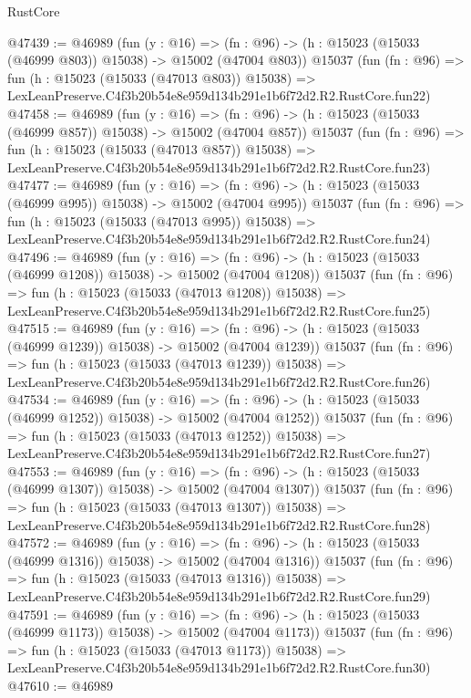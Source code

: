 \begin{lexlean}{RustCore}
\begin{coremodule}
@47439 := @46989
    (fun (y : @16) =>
    (fn : @96) -> (h : @15023 (@15033 (@46999 @803)) @15038) -> @15002 (@47004 @803))
    @15037
    (fun (fn : @96) =>
    fun (h : @15023 (@15033 (@47013 @803)) @15038) =>
    LexLeanPreserve.C4f3b20b54e8e959d134b291e1b6f72d2.R2.RustCore.fun22)
@47458 := @46989
    (fun (y : @16) =>
    (fn : @96) -> (h : @15023 (@15033 (@46999 @857)) @15038) -> @15002 (@47004 @857))
    @15037
    (fun (fn : @96) =>
    fun (h : @15023 (@15033 (@47013 @857)) @15038) =>
    LexLeanPreserve.C4f3b20b54e8e959d134b291e1b6f72d2.R2.RustCore.fun23)
@47477 := @46989
    (fun (y : @16) =>
    (fn : @96) -> (h : @15023 (@15033 (@46999 @995)) @15038) -> @15002 (@47004 @995))
    @15037
    (fun (fn : @96) =>
    fun (h : @15023 (@15033 (@47013 @995)) @15038) =>
    LexLeanPreserve.C4f3b20b54e8e959d134b291e1b6f72d2.R2.RustCore.fun24)
@47496 := @46989
    (fun (y : @16) =>
    (fn : @96) -> (h : @15023 (@15033 (@46999 @1208)) @15038) -> @15002 (@47004 @1208))
    @15037
    (fun (fn : @96) =>
    fun (h : @15023 (@15033 (@47013 @1208)) @15038) =>
    LexLeanPreserve.C4f3b20b54e8e959d134b291e1b6f72d2.R2.RustCore.fun25)
@47515 := @46989
    (fun (y : @16) =>
    (fn : @96) -> (h : @15023 (@15033 (@46999 @1239)) @15038) -> @15002 (@47004 @1239))
    @15037
    (fun (fn : @96) =>
    fun (h : @15023 (@15033 (@47013 @1239)) @15038) =>
    LexLeanPreserve.C4f3b20b54e8e959d134b291e1b6f72d2.R2.RustCore.fun26)
@47534 := @46989
    (fun (y : @16) =>
    (fn : @96) -> (h : @15023 (@15033 (@46999 @1252)) @15038) -> @15002 (@47004 @1252))
    @15037
    (fun (fn : @96) =>
    fun (h : @15023 (@15033 (@47013 @1252)) @15038) =>
    LexLeanPreserve.C4f3b20b54e8e959d134b291e1b6f72d2.R2.RustCore.fun27)
@47553 := @46989
    (fun (y : @16) =>
    (fn : @96) -> (h : @15023 (@15033 (@46999 @1307)) @15038) -> @15002 (@47004 @1307))
    @15037
    (fun (fn : @96) =>
    fun (h : @15023 (@15033 (@47013 @1307)) @15038) =>
    LexLeanPreserve.C4f3b20b54e8e959d134b291e1b6f72d2.R2.RustCore.fun28)
@47572 := @46989
    (fun (y : @16) =>
    (fn : @96) -> (h : @15023 (@15033 (@46999 @1316)) @15038) -> @15002 (@47004 @1316))
    @15037
    (fun (fn : @96) =>
    fun (h : @15023 (@15033 (@47013 @1316)) @15038) =>
    LexLeanPreserve.C4f3b20b54e8e959d134b291e1b6f72d2.R2.RustCore.fun29)
@47591 := @46989
    (fun (y : @16) =>
    (fn : @96) -> (h : @15023 (@15033 (@46999 @1173)) @15038) -> @15002 (@47004 @1173))
    @15037
    (fun (fn : @96) =>
    fun (h : @15023 (@15033 (@47013 @1173)) @15038) =>
    LexLeanPreserve.C4f3b20b54e8e959d134b291e1b6f72d2.R2.RustCore.fun30)
@47610 := @46989

\end{coremodule}
\end{lexlean}
